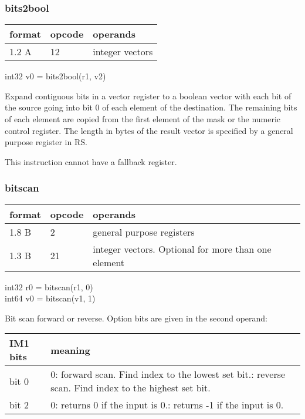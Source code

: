 \documentclass[forwardcom.tex]{subfiles}
\begin{document}
\subsubsection{bits2bool}
\label{table:bits2boolInstruction}
\begin{tabular}{|p{12mm}|p{12mm}|p{110mm}|}
\hline
\bfseries format & \bfseries opcode & \bfseries operands \\ \hline
1.2 A & 12 & integer vectors \\ \hline
\end{tabular}
\vspace{2mm}

int32 v0 = bits2bool(r1, v2)
\vspace{2mm}

Expand contiguous bits in a vector register to a boolean vector with each bit of the source going into bit 0 of each element of the destination. 
The remaining bits of each element are copied from the first element of the mask or the numeric control register.
The length in bytes of the result vector is specified by a general purpose register in RS.
\vspace{2mm}

This instruction cannot have a fallback register.

\subsubsection{bitscan}
\label{table:bitscanInstruction}
\begin{tabular}{|p{12mm}|p{12mm}|p{110mm}|}
\hline
\bfseries format & \bfseries opcode & \bfseries operands \\ \hline
1.8 B &  2 & general purpose registers \\ \hline
1.3 B & 21 & integer vectors. Optional for more than one element \\ \hline
\end{tabular}
\vspace{2mm}

int32 r0 = bitscan(r1, 0)\\
int64 v0 = bitscan(v1, 1)
\vspace{2mm}

Bit scan forward or reverse. Option bits are given in the second operand:
\vspace{2mm}

\label{table:bitscanOptions}
\begin{tabular}{|p{16mm}|p{122mm}|}
\hline
\bfseries IM1 bits & \bfseries meaning \\ \hline
bit 0 & 0: forward scan. Find index to the lowest set bit.\newline
        1: reverse scan. Find index to the highest set bit.\\
\hline
bit 2 & 0: returns 0 if the input is 0.\newline
        1: returns -1 if the input is 0.\\ \hline
\end{tabular}
\vspace{2mm}
\end{document}
